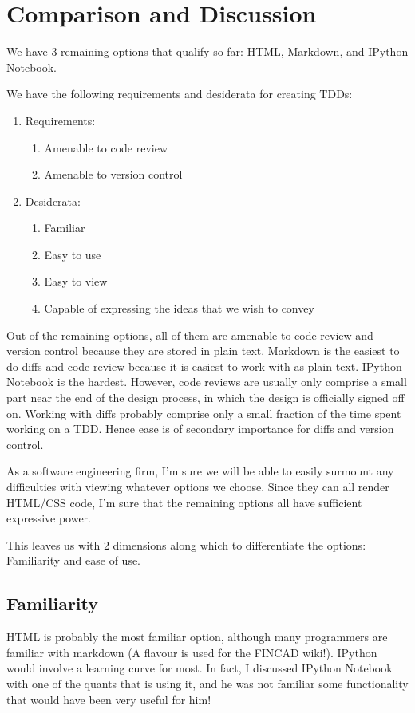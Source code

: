 \documentclass[]{article}
\begin{document}
		


\section{Comparison and Discussion}
We have 3 remaining options that qualify so far: HTML, Markdown, and IPython Notebook.

We have the following requirements and desiderata for creating TDDs:

\begin{enumerate}
	\item Requirements:
		\begin{enumerate}
			\item Amenable to code review
			\item Amenable to version control
		\end{enumerate}
	\item Desiderata:
		\begin{enumerate}
			\item Familiar
			\item Easy to use
			\item Easy to view
			\item Capable of expressing the ideas that we wish to convey			
		\end{enumerate}
\end{enumerate}

Out of the remaining options, all of them are amenable to code review and version control because they are stored in plain text.  
Markdown is the easiest to do diffs and code review because it is easiest to work with as plain text.  
IPython Notebook is the hardest.  However, code reviews are usually only comprise a small part near the end of the design process, 
in which the design is officially signed off on.  Working with diffs probably comprise only a small fraction of the time spent working on a TDD.  
Hence ease is of secondary importance for diffs and version control.

As a software engineering firm, I'm sure we will be able to easily surmount any difficulties with viewing whatever options we choose.  
Since they can all render HTML/CSS code, I'm sure that the remaining options all have sufficient expressive power.

This leaves us with 2 dimensions along which to differentiate the options: Familiarity and ease of use.


\subsection{Familiarity}
HTML is probably the most familiar option, although many programmers are familiar with markdown 
(A flavour is used for the FINCAD wiki!).  IPython would involve a learning curve for most.  In fact, I discussed 
IPython Notebook with one of the quants that is using it, and he was not familiar some functionality that 
would have been very useful for him!
\end{document}
